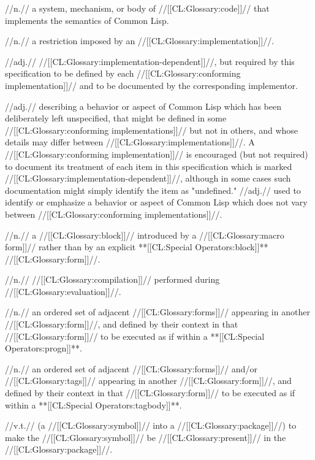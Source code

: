  //n.// a system, mechanism, or body of //[[CL:Glossary:code]]// that implements the semantics of Common Lisp.

 //n.// a restriction imposed by an //[[CL:Glossary:implementation]]//.
 
 //adj.// //[[CL:Glossary:implementation-dependent]]//, but required by this specification to be defined by each //[[CL:Glossary:conforming implementation]]// and to be documented by the corresponding implementor.
 
 //adj.// describing a behavior or aspect of Common Lisp which has been deliberately left unspecified, that might be defined in some //[[CL:Glossary:conforming implementations]]// but not in others, and whose details may differ between //[[CL:Glossary:implementations]]//. A //[[CL:Glossary:conforming implementation]]// is encouraged (but not required) to document its treatment of each item in this specification which is marked //[[CL:Glossary:implementation-dependent]]//, although in some cases such documentation might simply identify the item as "undefined." 
 //adj.// used to identify or emphasize a behavior or aspect of Common Lisp which does not vary between //[[CL:Glossary:conforming implementations]]//.

 //n.// 
 a //[[CL:Glossary:block]]// introduced by a //[[CL:Glossary:macro form]]// 
 rather than by an explicit **[[CL:Special Operators:block]]** //[[CL:Glossary:form]]//.

 //n.// 
 //[[CL:Glossary:compilation]]// performed during //[[CL:Glossary:evaluation]]//.

 //n.// an ordered set of adjacent //[[CL:Glossary:forms]]// appearing in another //[[CL:Glossary:form]]//, and defined by their context in that //[[CL:Glossary:form]]// to be executed as if within a **[[CL:Special Operators:progn]]**.

 //n.// an ordered set of adjacent //[[CL:Glossary:forms]]// and/or //[[CL:Glossary:tags]]// appearing in another //[[CL:Glossary:form]]//, and defined by their context in that //[[CL:Glossary:form]]// to be executed as if within a **[[CL:Special Operators:tagbody]]**.

 //v.t.// (a //[[CL:Glossary:symbol]]// into a //[[CL:Glossary:package]]//) to make the //[[CL:Glossary:symbol]]// be //[[CL:Glossary:present]]// in the //[[CL:Glossary:package]]//.

